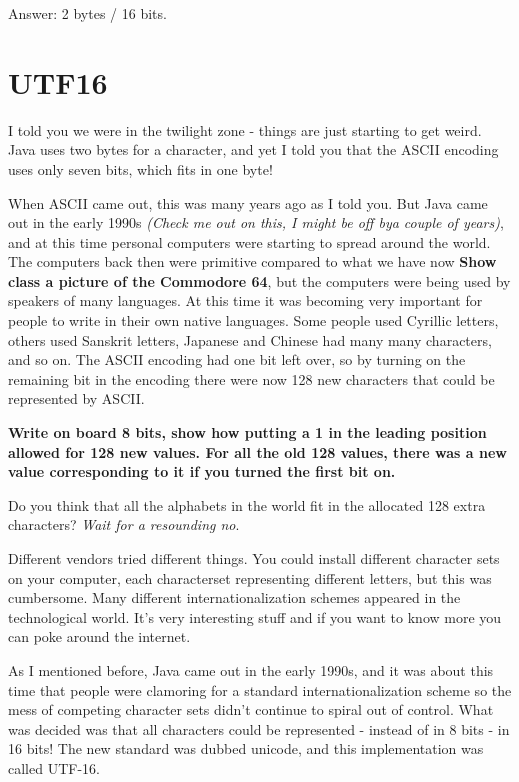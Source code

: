 \documentclass[12pt]{article}
\begin{document}
Answer: 2 bytes / 16 bits.

\section{UTF16}
I told you we were in the twilight zone - things are just starting to get weird. Java uses two bytes for a character, and yet I told you that the ASCII encoding uses only seven bits, which fits in one byte!

When ASCII came out, this was many years ago as I told you. But Java came out in the early 1990s \textit{(Check me out on this, I might be off bya couple of years)}, and at this time personal computers were starting to spread around the world. The computers back then were primitive compared to what we have now \textbf{Show class a picture of the Commodore 64}, but the computers were being used by speakers of many languages. At this time it was becoming very important for people to write in their own native languages. Some people used Cyrillic letters, others used Sanskrit letters, Japanese and Chinese had many many characters, and so on. The ASCII encoding had one bit left over, so by turning on the remaining bit in the encoding there were now 128 new characters that could be represented by ASCII.

\begin{center}
\textbf{Write on board 8 bits, show how putting a 1 in the leading position allowed for 128 new values. For all the old 128 values, there was a new value corresponding to it if you turned the first bit on.}
\end{center}

Do you think that all the alphabets in the world fit in the allocated 128 extra characters? \textit{Wait for a resounding no}.

Different vendors tried different things. You could install different character sets on your computer, each characterset representing different letters, but this was cumbersome. Many different internationalization schemes appeared in the technological world. It's very interesting stuff and if you want to know more you can poke around the internet.

As I mentioned before, Java came out in the early 1990s, and it was about this time that people were clamoring for a standard internationalization scheme so the mess of competing character sets didn't continue to spiral out of control. What was decided was that all characters could be represented - instead of in 8 bits - in 16 bits! The new standard was dubbed unicode, and this implementation was called UTF-16. 
\end{document}
